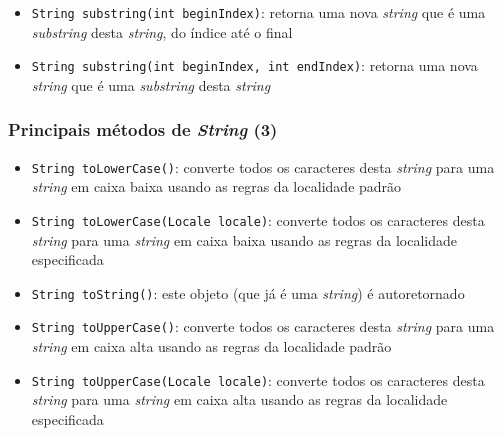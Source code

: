 \documentclass[xcolor={dvipsnames,table},aspectratio=169]{beamer}
\begin{document}
\begin{frame}
\begin{itemize}

\item \texttt{String substring(int beginIndex)}: retorna uma nova \emph{string} que é uma \emph{substring} desta \emph{string}, do índice até o final
\item \texttt{String substring(int beginIndex, int endIndex)}: retorna uma nova \emph{string} que é uma \emph{substring} desta \emph{string}
\end{itemize}
\end{frame}

\begin{frame}\frametitle{Principais métodos de \emph{String} (3)}
\begin{itemize}
\item \texttt{String toLowerCase()}: converte todos os caracteres desta \emph{string} para uma \emph{string} em caixa baixa usando as regras da localidade padrão
\item \texttt{String toLowerCase(Locale locale)}: converte todos os caracteres desta \emph{string} para uma \emph{string} em caixa baixa usando as regras da localidade especificada
\item \texttt{String toString()}: este objeto (que já é uma \emph{string}) é autoretornado
\item \texttt{String toUpperCase()}: converte todos os caracteres desta \emph{string} para uma \emph{string} em caixa alta usando as regras da localidade padrão
\item \texttt{String toUpperCase(Locale locale)}: converte todos os caracteres desta \emph{string} para uma \emph{string} em caixa alta usando as regras da localidade especificada
\end{itemize}
\end{frame}
\end{document}
